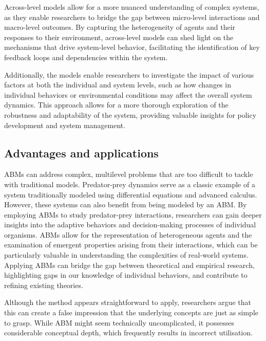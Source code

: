     Across-level models allow for a more nuanced understanding of complex systems, as they enable researchers to bridge the gap between micro-level interactions and macro-level outcomes. By capturing the heterogeneity of agents and their responses to their environment, across-level models can shed light on the mechanisms that drive system-level behavior, facilitating the identification of key feedback loops and dependencies within the system.

    Additionally, the models enable researchers to investigate the impact of various factors at both the individual and system levels, such as how changes in individual behaviors or environmental conditions may affect the overall system dynamics. This approach allows for a more thorough exploration of the robustness and adaptability of the system, providing valuable insights for policy development and system management.

\subsection{Advantages and applications}
    ABMs can address complex, multilevel problems that are too difficult to tackle with traditional models. Predator-prey dynamics serve as a classic example of a system traditionally modeled using differential equations and advanced calculus. However, these systems can also benefit from being modeled by an ABM\cite{railsback2020pred-prey}. By employing ABMs to study predator-prey interactions, researchers can gain deeper insights into the adaptive behaviors and decision-making processes of individual organisms. ABMs allow for the representation of heterogeneous agents and the examination of emergent properties arising from their interactions, which can be particularly valuable in understanding the complexities of real-world systems. Applying ABMs can bridge the gap between theoretical and empirical research, highlighting gaps in our knowledge of individual behaviors, and contribute to refining existing theories.

    Although the method appears straightforward to apply, researchers argue that this can create a false impression that the underlying concepts are just as simple to grasp. While ABM might seem technically uncomplicated, it possesses considerable conceptual depth, which frequently results in incorrect utilisation.